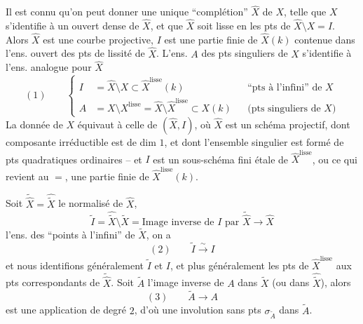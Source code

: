 Il est connu qu'on peut donner une unique ``complétion'' $\widehat X$ de $X$, telle que  $X$ s'identifie à un ouvert dense de $\widehat X$, et que $\widehat X$ soit lisse en les pts de $\widehat X\setminus X=I$. Alors $\widehat X$ est une courbe projective, $I$ est  une partie finie de $\widehat X(k)$ contenue dans l'ens. ouvert des pts de lissité de $\widehat X$. L'ens. $A$ des pts singuliers de $X$ s'identifie à l'ens. analogue pour $\widehat X$
\[
(1)\qquad
\left\{\begin{aligned}
I&=\widehat X\setminus X\subset\widehat X^{\mathrm{lisse}}(k)
&&\text{``pts à l'infini'' de }X\\
A&=X\setminus X^{\mathrm{lisse}}=\widehat X\setminus\widehat X^{\mathrm{lisse}}\subset X(k)
&&\text{(pts singuliers de }X\text{)}
\end{aligned}\right.
\]
La donnée de $X$ équivaut à celle de
$(\widehat X,I)$, où $\widehat X$ est un schéma projectif, dont  composante irréductible est de dim $1$, et dont l'ensemble singulier est formé de pts quadratiques ordinaires -- et $I$ est un sous-schéma fini étale de $\widehat X^{\mathrm{lisse}}$, ou ce qui revient au $=$, une partie finie de $\widehat X^{\mathrm{lisse}}(k)$.

Soit $\widetilde{\widehat X}=\widehat{\widetilde X}$ le normalisé de $\widehat X$, 
\[
\widetilde I=\widehat{\widetilde X}\setminus\widetilde X
=\text{Image inverse de }I\text{ par }\widetilde{\widehat X}\to\widehat X
\]
l'ens. des  ``points à l'infini'' de $\widetilde X$, on a
\[
(2)\qquad\widetilde I\xrightarrow{\sim}I
\]
et nous identifions généralement $\widetilde I$ et $I$, et plus généralement  les pts de $\widehat X^{\mathrm{lisse}}$ aux pts correspondants de $\widetilde{\widehat X}$. Soit $\widetilde A$ l'image inverse de $A$ dans $\widetilde X$ (ou dans $\widehat{\widetilde X}$), alors
\[
(3)\qquad\widetilde A\longrightarrow A
\]
est une application de degré $2$, d'où une involution sans pts  $\sigma_{\widetilde A}$ dans $\widetilde A$.

